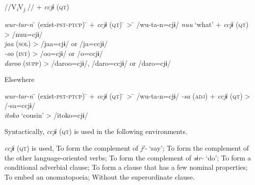   \ex //V\textit{\textsubscript{i}}V\textit{\textsubscript{j} }// + \textit{ccjɨ} (\textsc{qt})\\
  \begin{tabbing}
  \textit{wur-tar-n} \hspace{\tabcolsep}\=\hspace{\tabcolsep} (exist-\textsc{pst}-\textsc{ptcp}) \hspace{\tabcolsep}\=\hspace{\tabcolsep} +  \textit{ccjɨ}  (\textsc{qt}) \hspace{\tabcolsep}\=\hspace{\tabcolsep} > \hspace{\tabcolsep}\=\hspace{\tabcolsep} /wu-ta-n=cjɨ/\kill
  \textit{nuu}  \> ‘what’ \> +  \textit{ccjɨ}  (\textsc{qt}) \> > \> /nuu=cjɨ/\\
  \textit{jaa} \> (\textsc{sol}) \>   \>    > \> /jaa=cjɨ/ or /ja=ccjɨ/\\
  \textit{{}-oo} \> (\textsc{int})   \>  \>   > \> /oo=cjɨ/ or /o=ccjɨ/\\
  \textit{daroo} \> (\textsc{supp})   \>  \>   > \> /daroo=cjɨ/, /daro=ccjɨ/ or /daro=cjɨ/
  \end{tabbing}

  \ex Elsewhere\\
  \begin{tabbing}
  \textit{wur-tar-n} \hspace{\tabcolsep}\=\hspace{\tabcolsep} (exist-\textsc{pst}-\textsc{ptcp}) \hspace{\tabcolsep}\=\hspace{\tabcolsep} +  \textit{ccjɨ}  (\textsc{qt}) \hspace{\tabcolsep}\=\hspace{\tabcolsep} > \hspace{\tabcolsep}\=\hspace{\tabcolsep} /wu-ta-n=cjɨ/\kill
  \textit{{}-sa} \> (\textsc{adj})  \> +  \textit{ccjɨ}  (\textsc{qt})  \> > \> /-sa=ccjɨ/\\
  \textit{itoko} \> ‘cousin’    \> \>   > \> /itoko=cjɨ/
  \end{tabbing}
  \z
\z

Syntactically, \textit{ccjɨ} (\textsc{qt}) is used in the following environments.

\ea\label{ex:10.61}\textit{ccjɨ} (\textsc{qt}) is used,
  \ea  To form the complement of \textit{jˀ-} ‘say’;
  \ex  To form the complement of the other language-oriented verbs;
  \ex  To form the complement of \textit{sɨr-} ‘do’;
  \ex  To form a conditional adverbial clause;
  \ex  To form a clause that has a few nominal properties;
  \ex  To embed an onomatopoeia;
  \ex  Without the superordinate clause.
  \z
\z

